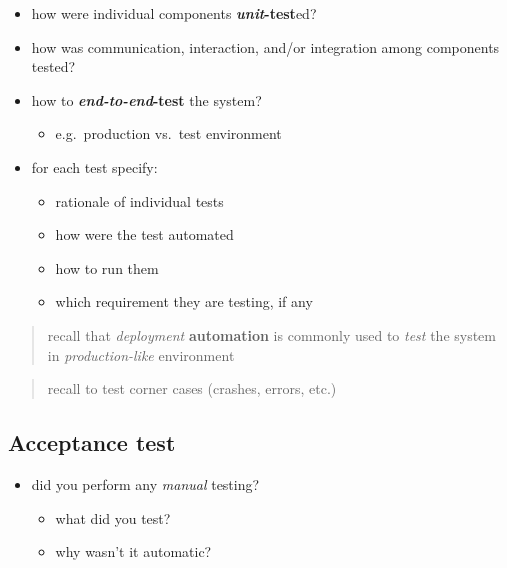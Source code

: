 \documentclass{scrartcl}
\begin{document}
\begin{itemize}
      \item how were individual components \textbf{\emph{unit}-test}ed?
      \item how was communication, interaction, and/or integration among
            components tested?
      \item how to \textbf{\emph{end-to-end}-test} the system?

            \begin{itemize}
                  \item e.g.~production vs.~test environment
            \end{itemize}
      \item for each test specify:

            \begin{itemize}
                  \item rationale of individual tests
                  \item how were the test automated
                  \item how to run them
                  \item which requirement they are testing, if any
            \end{itemize}
\end{itemize}

\begin{quote}
      recall that \emph{deployment} \textbf{automation} is commonly used to
      \emph{test} the system in \emph{production-like} environment
\end{quote}

\begin{quote}
      recall to test corner cases (crashes, errors, etc.)
\end{quote}

\subsection{Acceptance test}\label{acceptance-test}

\begin{itemize}
      \item did you perform any \emph{manual} testing?

            \begin{itemize}
                  \item what did you test?
                  \item why wasn't it automatic?
            \end{itemize}
\end{itemize}
\end{document}

